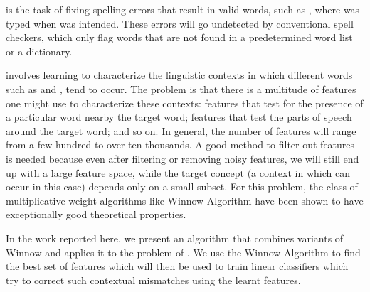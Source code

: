 
\textit{\projectTitle{}} is the task of fixing spelling errors that result in
valid words, such as , where 
was typed when  was intended. These errors will go undetected
by conventional spell checkers, which only flag words that are not found in a
predetermined word list or a dictionary.

\textit{\projectTitle{}} involves learning to characterize the linguistic
contexts in which different words such as  and
, tend to occur. The problem is that there is a multitude of
features one might use to characterize these contexts: features that test for
the presence of a particular word nearby the target word; features that test
the parts of speech around the target word; and so on. In general, the number
of features will range from a few hundred to over ten thousands. A good method
to filter out features is needed because even after filtering or removing noisy
features, we will still end up with a large feature space, while the target
concept (a context in which  can occur in this case) depends
only on a small subset. For this problem, the class of multiplicative weight
algorithms like Winnow Algorithm have been shown to have exceptionally good
theoretical properties.

In the work reported here, we present an algorithm that combines variants of
Winnow and applies it to the problem of \textit{\projectTitle{}}. We use the
Winnow Algorithm to find the best set of features which will then be used to
train linear classifiers which try to correct such contextual mismatches using
the learnt features.
